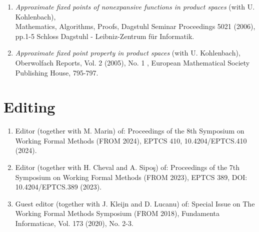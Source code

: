 \documentclass[12pt]{article}
\begin{document}
\begin{enumerate}
\item {\em Approximate fixed points of nonexpansive functions in product spaces} (with U. Kohlenbach),\\
Mathematics, Algorithms, Proofs, Dagstuhl Seminar Proceedings 5021  (2006), pp.1-5 Schloss Dagstuhl - Leibniz-Zentrum f\"ur Informatik.

\item {\em Approximate fixed point property in product spaces} (with U. Kohlenbach),\\
 Oberwolfach Reports, Vol. 2 (2005), No. 1 , European Mathematical Society Publishing House, 795-797.


\end{enumerate}



\section{Editing}

\begin{enumerate}
\item Editor (together with  M. Marin) of: Proceedings of the 8th Symposium on Working Formal Methods (FROM 2024), EPTCS 410, 10.4204/EPTCS.410 (2024).
\item Editor (together with  H. Cheval and A. Sipo\c{s}) of: Proceedings of the 7th Symposium on Working Formal Methods (FROM 2023), EPTCS 389, DOI: 10.4204/EPTCS.389 (2023).
\item Guest editor (together with J. Kleijn and D. Lucanu) of:  Special Issue on The Working Formal Methods Symposium (FROM 2018),  Fundamenta Informaticae, Vol. 173 (2020), No. 2-3.
\end{enumerate}
\end{document}

